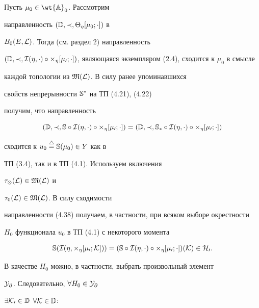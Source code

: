 \begin{pf}


Пусть $\mu_0\in\wt{\Bbb A}_0$. Рассмотрим


направленность $(\Bbb D,\prec,\Theta_\eta[\mu_0;\cdot])$ в


$B_0(E,\cal L)$. Тогда (см. раздел 2) направленность


$(\Bbb D,\prec,\cal I(\eta,\cdot)\circ\Theta_\eta[\mu_0;


\cdot])$, являющаяся экземпляром (2.4), сходится к $\mu_0$ в смысле


каждой топологии из $\frak M(\cal L)$. В силу ранее упоминавшихся


свойств непрерывности $\Bbb S^*$ на ТП (4.21), (4.22)


получим, что направленность


\begin{equation}


(\Bbb D,\prec,\Bbb S\circ\cal I(\eta,\cdot)\circ


\Theta_\eta[\mu_0;\cdot])=(\Bbb D,\prec,


\Bbb S_*\circ\cal I(\eta,\cdot)\circ\Theta_\eta[\mu_0;\cdot])


\end{equation}


сходится к $u_0\overset{\triangle}{=}\Bbb S(\mu_0)\in Y$ как в


ТП (3.4), так и в ТП (4.1). Используем включения


$\tau_\otimes(\cal L)\in\frak M(\cal L)$ и


$\tau_0(\cal L)\in\frak M(\cal L)$. В силу сходимости


направленности (4.38) получаем, в частности, при всяком выборе окрестности


$H_0$ функционала $u_0$ в ТП (4.1) с некоторого момента


$$


\Bbb S(\cal I(\eta,\Theta_\eta[\mu_0;\cal K]))=


(\Bbb S\circ\cal I(\eta,\cdot)\circ\Theta_\eta[\mu_0;


\cdot])(\cal K)\in H_0.


$$


В качестве $H_0$ можно, в частности, выбрать произвольный элемент


$\cal Y_\partial$. Следовательно, $\forall H_0\in\cal Y_\partial$


$\exists\cal K_0\in\Bbb D$ $\forall\cal K\in\Bbb D$:


\begin{equation}



\end{equation}
\end{pf}

